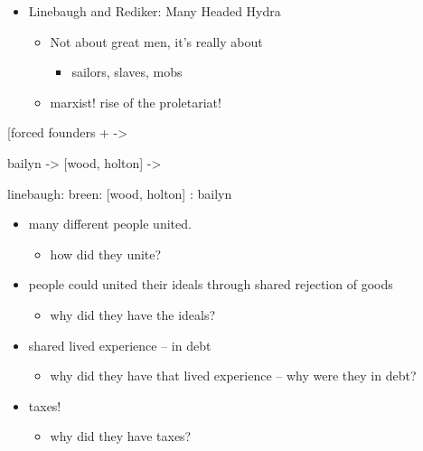 \documentclass[letterpaper]{article}
\begin{document}
\begin{itemize}
\begin{itemize}
\item Linebaugh and Rediker: Many Headed Hydra

\begin{itemize}
\item Not about great men, it's really about

\begin{itemize}
\item sailors, slaves, mobs
\end{itemize}

\item marxist! rise of the proletariat!
\end{itemize}
\end{itemize}
\end{itemize}

[forced founders + ->

bailyn -> [wood, holton] ->

linebaugh: breen: [wood, holton] : bailyn

\begin{itemize}
\item many different people united.

\begin{itemize}
\item how did they unite?
\end{itemize}

\item people could united their ideals through shared rejection of goods

\begin{itemize}
\item why did they have the ideals?
\end{itemize}

\item shared lived experience -- in debt

\begin{itemize}
\item why did they have that lived experience -- why were they in debt?
\end{itemize}

\item taxes!

\begin{itemize}
\item why did they have taxes?
\end{itemize}
\end{itemize}
\end{document}
